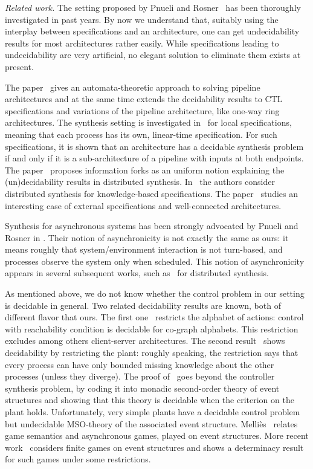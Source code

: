 \documentclass{llncs}
\begin{document}
\noindent\textit{Related work.}
The setting proposed by Pnueli and Rosner~\cite{PR90} has been
thoroughly investigated in past years. 
By now we understand that, suitably using
the interplay 
between specifications and an architecture, one can get undecidability
results for most architectures rather easily. While
specifications leading to undecidability are very artificial, no
elegant solution to eliminate them exists at present.


The paper~\cite{kv01} gives an automata-theoretic approach to
solving pipeline architectures and at the same time extends the
decidability results to CTL specifications and variations of the
pipeline architecture, like one-way ring architectures. The synthesis
setting is investigated in~\cite{MadThiag01} for local
specifications, meaning that each process has its own, linear-time
specification. For such specifications, it is shown that an
architecture has a decidable synthesis problem if and only if it is a
sub-architecture of a pipeline with inputs at both endpoints.
The paper~\cite{FinSch05} proposes information forks as an uniform
notion explaining the (un)decidability results in distributed
synthesis. 
In~\cite{MeyWil05} the authors consider distributed synthesis for
knowledge-based 
specifications. The paper~\cite{GasSznZei09} studies an interesting case
of external specifications and well-connected architectures.

Synthesis for asynchronous systems has been strongly advocated by Pnueli
and Rosner in \cite{PR89icalp}. Their notion of asynchronicity
is not exactly the same as ours: it means roughly that system/environment
interaction is not
turn-based, and processes observe the system only when
scheduled.
 This notion of asynchronicity appears in
several subsequent works, such as~\cite{sf06,KatSchPel11} for distributed
synthesis.


 
As mentioned above, we do not know whether the control problem in our setting is
decidable in general. Two related decidability results are known, both
of different flavor that ours. The first one~\cite{GLZ04} restricts the alphabet of actions: control with reachability
condition is decidable for co-graph alphabets.  This restriction 
excludes among others client-server architectures.
The second result~\cite{MTY05} shows decidability by restricting the
plant: roughly speaking, the restriction says that every process
can have only bounded missing knowledge about the other processes (unless
they diverge). The proof
of~\cite{MTY05} goes beyond the controller synthesis problem, by
coding it into monadic second-order theory of event structures and
showing that this theory is decidable when the criterion on the plant
holds. Unfortunately, very simple plants have a  decidable control problem but
undecidable MSO-theory of the associated event structure.
Melli\`es~\cite{mel06} relates game semantics and asynchronous games, played
on event structures.
More recent 
work~\cite{cgw12} considers finite games on event structures
and shows a determinacy result for such games under some restrictions.
\end{document}
